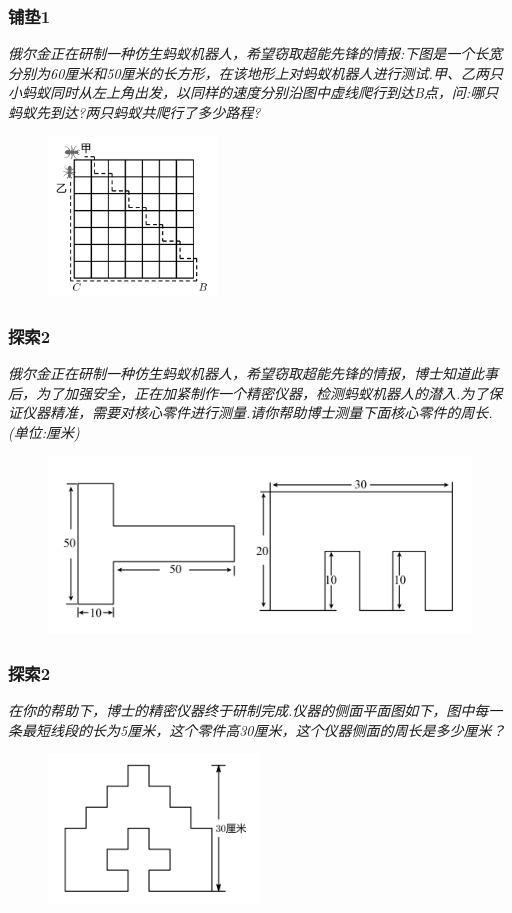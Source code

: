 \begin{frame}
    \frametitle{铺垫1}
    \textit{俄尔金正在研制一种仿生蚂蚁机器人，希望窃取超能先锋的情报:下图是一个长宽分别为60厘米和50厘米的长方形，在该地形上对蚂蚁机器人进行测试.甲、乙两只小蚂蚁同时从左上角出发，以同样的速度分别沿图中虚线爬行到达B点，问:哪只蚂蚁先到达?两只蚂蚁共爬行了多少路程?}
    \begin{figure}[H] 
        \centering
        \includegraphics[width=0.4\textwidth]{./pics/Chapter_1/pudian1.png}
    \end{figure}
\end{frame}

\begin{frame}
    \frametitle{探索2}
    \textit{俄尔金正在研制一种仿生蚂蚁机器人，希望窃取超能先锋的情报，博士知道此事后，为了加强安全，正在加紧制作一个精密仪器，检测蚂蚁机器人的潜入.为了保证仪器精准，需要对核心零件进行测量.请你帮助博士测量下面核心零件的周长.(单位:厘米)}
    \begin{figure}[H] 
        \centering
        \includegraphics[width=1\textwidth]{./pics/Chapter_1/tansuo2.png}
    \end{figure}
\end{frame}

\begin{frame}
    \frametitle{探索2}
    \textit{在你的帮助下，博士的精密仪器终于研制完成.仪器的侧面平面图如下，图中每一条最短线段的长为5厘米，这个零件高30厘米，这个仪器侧面的周长是多少厘米？}
    \begin{figure}[H] 
        \centering
        \includegraphics[width=0.5\textwidth]{./pics/Chapter_1/tansuo2_2.png}
    \end{figure}
\end{frame}

